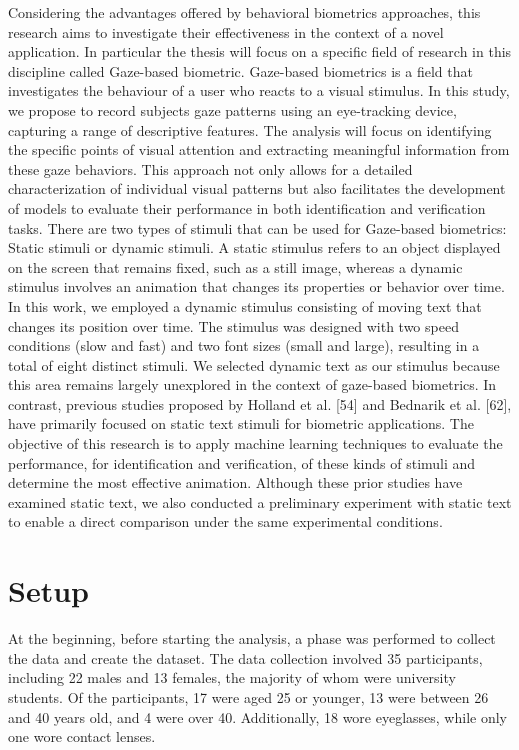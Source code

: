 \documentclass[12pt]{report}
\begin{document}
Considering the advantages offered by behavioral biometrics approaches, this research aims to investigate their effectiveness in the context of a novel application.
In particular the thesis will focus on a specific field of research in this discipline called Gaze-based biometric.
Gaze-based biometrics is a field that investigates the behaviour of a user who reacts to a visual stimulus.
In this study, we propose to record subjects gaze patterns using an eye-tracking device, capturing a range of descriptive features.
The analysis will focus on identifying the specific points of visual attention and extracting meaningful information from these gaze behaviors.
This approach not only allows for a detailed characterization of individual visual patterns but also facilitates the development of models to evaluate their performance in both identification and verification tasks.
There are two types of stimuli that can be used for Gaze-based biometrics: Static stimuli or dynamic stimuli.
A static stimulus refers to an object displayed on the screen that remains fixed, such as a still image, whereas a dynamic stimulus involves an animation that changes its properties or behavior over time.
In this work, we employed a dynamic stimulus consisting of moving text that changes its position over time.
The stimulus was designed with two speed conditions (slow and fast) and two font sizes (small and large), resulting in a total of eight distinct stimuli.
We selected dynamic text as our stimulus because this area remains largely unexplored in the context of gaze-based biometrics.
In contrast, previous studies proposed by Holland et al. [54] and Bednarik et al. [62], have primarily focused on static text stimuli for biometric applications.
The objective of this research is to apply machine learning techniques to evaluate the performance, for identification and verification, of these kinds of stimuli and determine the most effective animation. 
Although these prior studies have examined static text, we also conducted a preliminary experiment with static text to enable a direct comparison under the same experimental conditions.

\section{Setup}
At the beginning, before starting the analysis, a phase was performed to collect the data and create the dataset.
The data collection involved 35 participants, including 22 males and 13 females, the majority of whom were university students.
Of the participants, 17 were aged 25 or younger, 13 were between 26 and 40 years old, and 4 were over 40. 
Additionally, 18 wore eyeglasses, while only one wore contact lenses.
\end{document}
